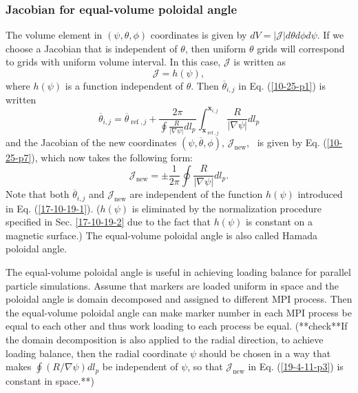 \documentclass{article}
\newcommand{\tmop}[1]{\ensuremath{\operatorname{#1}}}
\begin{document}
\subsubsection{Jacobian for equal-volume poloidal angle}

The volume element in $(\psi, \theta, \phi)$ coordinates is given by $d V =
|\mathcal{J}| d \theta d \phi d \psi$. If we choose a Jacobian that is
independent of $\theta$, then uniform $\theta$ grids will correspond to grids
with uniform volume interval. In this case, $\mathcal{J}$ is written as
\begin{equation}
  \label{17-10-19-1} \mathcal{J}= h (\psi),
\end{equation}
where $h (\psi)$ is a function independent of $\theta$. Then
$\overline{\theta}_{i, j}$ in Eq. (\ref{10-25-p1}) is written
\begin{equation}
  \overline{\theta}_{i, j} = \overline{\theta}_{\tmop{ref}, j} + \frac{2
  \pi}{\oint \frac{R}{| \nabla \psi |} d l_p} \int_{\mathbf{x}_{\tmop{ref},
  j}}^{\mathbf{x}_{i, j}} \frac{R}{| \nabla \psi |} d l_p
\end{equation}
and the Jacobian of the new coordinates $(\psi, \overline{\theta}, \phi)$,
$\mathcal{J}_{\tmop{new}}$, \ is given by Eq. (\ref{10-25-p7}), which now
takes the following form:
\begin{equation}
  \label{19-4-11-p3} \mathcal{J}_{\tmop{new}} = \pm \frac{1}{2 \pi} \oint
  \frac{R}{| \nabla \psi |} d l_p .
\end{equation}
Note that both $\overline{\theta}_{i, j}$ and $\mathcal{J}_{\tmop{new}}$ are
independent of the function $h (\psi)$ introduced in Eq. (\ref{17-10-19-1}).
($h (\psi)$ is eliminated by the normalization procedure specified in Sec.
\ref{17-10-19-2} due to the fact that $h (\psi)$ is constant on a magnetic
surface.) The equal-volume poloidal angle is also called Hamada poloidal
angle.

The equal-volume poloidal angle is useful in achieving loading balance for
parallel particle simulations. Assume that markers are loaded uniform in space
and the poloidal angle is domain decomposed and assigned to different MPI
process. Then the equal-volume poloidal angle can make marker number in each
MPI process be equal to each other and thus work loading to each process be
equal. (**check**If the domain decomposition is also applied to the radial
direction, to achieve loading balance, then the radial coordinate $\psi$
should be chosen in a way that makes $\oint (R / \nabla \psi) d l_p$ be
independent of $\psi$, so that $\mathcal{J}_{\tmop{new}}$ in Eq.
(\ref{19-4-11-p3}) is constant in space.**)
\end{document}
